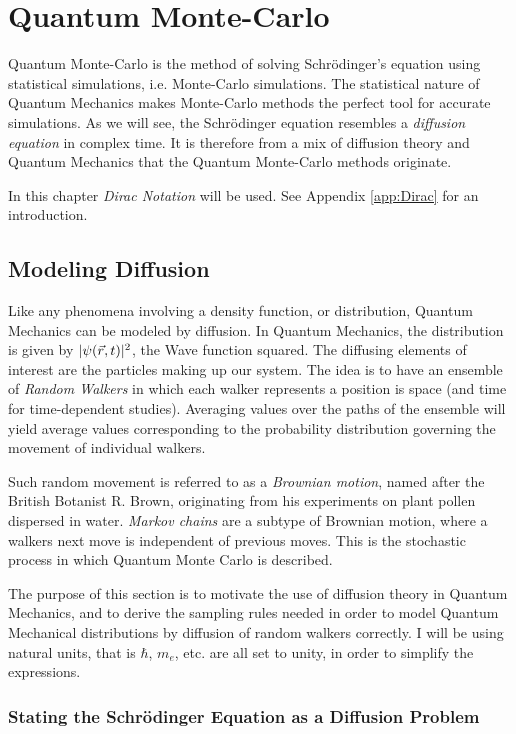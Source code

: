 \chapter{Quantum Monte-Carlo}

Quantum Monte-Carlo is the method of solving Schrödinger's equation using statistical simulations, i.e. Monte-Carlo simulations. The statistical nature of Quantum Mechanics makes Monte-Carlo methods the perfect tool for accurate simulations. As we will see, the Schrödinger equation resembles a \textit{diffusion equation} in complex time. It is therefore from a mix of diffusion theory and Quantum Mechanics that the Quantum Monte-Carlo methods originate.

In this chapter \textit{Dirac Notation} will be used. See Appendix \ref{app:Dirac} for an introduction.

\section{Modeling Diffusion}

Like any phenomena involving a density function, or distribution, Quantum Mechanics can be modeled by diffusion. In Quantum Mechanics, the distribution is given by $|\psi(\vec r, t)|^2$, the Wave function squared. The diffusing elements of interest are the particles making up our system. The idea is to have an ensemble of \textit{Random Walkers} in which each walker represents a position is space (and time for time-dependent studies). Averaging values over the paths of the ensemble will yield average values corresponding to the probability distribution governing the movement of individual walkers. 

Such random movement is referred to as a \textit{Brownian motion}, named after the British Botanist R. Brown, originating from his experiments on plant pollen dispersed in water. \textit{Markov chains} are a subtype of Brownian motion, where a walkers next move is independent of previous moves. This is the stochastic process in which Quantum Monte Carlo is described.

The purpose of this section is to motivate the use of diffusion theory in Quantum Mechanics, and to derive the sampling rules needed in order to model Quantum Mechanical distributions by diffusion of random walkers correctly. I will be using natural units, that is $\hbar$, $m_e$, etc. are all set to unity, in order to simplify the expressions.

\subsection{Stating the Schrödinger Equation as a Diffusion Problem}
\label{sec:statingDiff}

